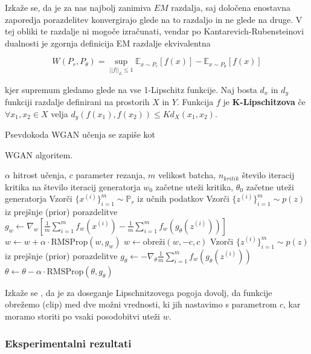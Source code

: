 \documentclass[12pt,a4paper,twoside]{article}
\theoremstyle{definition} %
\theoremstyle{plain} %
\numberwithin{equation}{section}  %
\begin{document}
Izkaže se, da je za nas najbolj zanimiva $EM$ razdalja, saj določena enostavna zaporedja porazdelitev konvergirajo glede na to razdaljo in ne glede na druge. V tej obliki te razdalje ni mogoče izračunati, vendar po Kantarevich-Rubensteinovi dualnosti  je zgornja definicija EM razdalje ekvivalentna 

$$ W(P_r,P_\theta) = \sup_{||f||_L \leq 1 } \mathbb{E}_{x \sim P_r} [f(x)] - \mathbb{E}_{x \sim P_\theta}[f(x)]$$ 

kjer supremum gledamo glede na vse 1-Lipschitz funkcije. Naj bosta $d_x$ in $d_y$ funkciji razdalje definirani na prostorih $X$ in $Y$. Funkcija $f$ je \textbf{K-Lipschitzova} če $\forall x_1,x_2 \in X$ velja $d_y(f(x_1),f(x_2)) \leq Kd_X(x_1,x_2)$.

Psevdokoda WGAN učenja se zapiše kot

\begin{algorithm}
\caption{WGAN algoritem.}\label{wgan-pseudo}
\begin{algorithmic}[1]
\Require $ \alpha $ hitrost učenja, $c$ parameter rezanja, $m$ velikost batcha, $n_{kritik}$ število iteracij kritika na število iteracij generatorja
\Require $w_0$ začetne uteži kritika, $\theta_0$ začetne uteži generatorja
		\State Vzorči $\{x^{(i)} \}_{i=1}^m \sim \mathbb{P}_r$ iz učnih podatkov
		\State Vzorči $\{z^{(i)} \}_{i=1}^m \sim p(z)$ iz prejšnje (prior) porazdelitve
		\State $g_w \leftarrow \nabla_w [\frac{1}{m} \sum_{i=1}^m f_w({x^{(i)}})  - \frac{1}{m}\sum_{i=1}^m f_w (g_\theta(z^{(i)}))]$
		\State $w \leftarrow w + \alpha \cdot \text{RMSProp}(w,g_w)$
		\State $w \leftarrow \text{obreži}(w,-c,c)$
	\EndFor
	\State Vzorči $\{z^{(i)}\}_{i=1}^m \sim p(z)$ iz prejšnje (prior) porazdelitve
	\State $g_\theta \leftarrow -\nabla_\theta \frac{1}{m} \sum_{i=1}^m f_w(g_\theta(z^{(i)}))$
	\State $\theta \leftarrow \theta - \alpha \cdot \text{RMSProp}(\theta,g_\theta)$
\EndWhile

\end{algorithmic}
\end{algorithm}

Izkaže se \cite{arjovsky2017wasserstein}, da je za doseganje Lipschnitzovega pogoja dovolj, da funkcije obrežemo (clip) med dve možni vrednosti, ki jih nastavimo s parametrom $c$, kar moramo storiti po vsaki posodobitvi uteži $w$. 
\subsubsection{Eksperimentalni rezultati}
\end{document}
